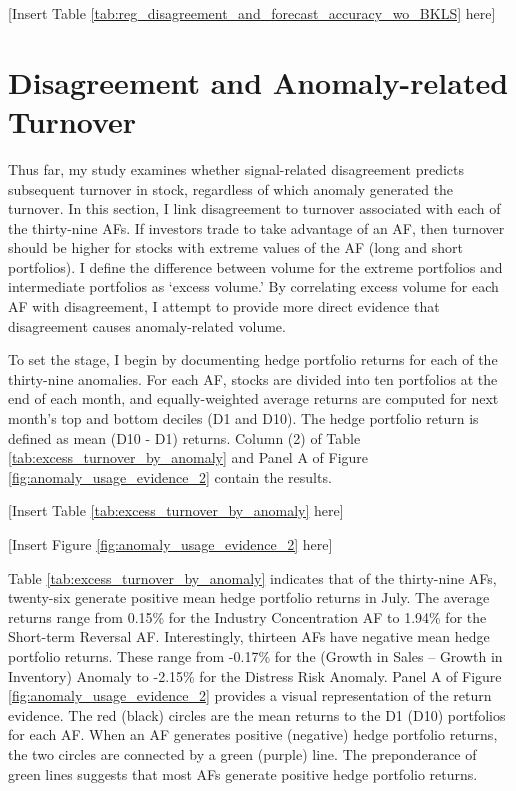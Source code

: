 \documentclass[
  12pt,
  a4paper,
  twoside,
  onecolumn]{article}
\begin{document}
\begin{center} { [Insert Table \ref{tab:reg_disagreement_and_forecast_accuracy_wo_BKLS} here] } \end{center}

\hypertarget{disagreement-and-anomaly-related-turnover}{%
\section{Disagreement and Anomaly-related
Turnover}\label{disagreement-and-anomaly-related-turnover}}

Thus far, my study examines whether signal-related disagreement predicts
subsequent turnover in stock, regardless of which anomaly generated the
turnover. In this section, I link disagreement to turnover associated
with each of the thirty-nine AFs. If investors trade to take advantage
of an AF, then turnover should be higher for stocks with extreme values
of the AF (long and short portfolios). I define the difference between
volume for the extreme portfolios and intermediate portfolios as `excess
volume.' By correlating excess volume for each AF with disagreement, I
attempt to provide more direct evidence that disagreement causes
anomaly-related volume.

To set the stage, I begin by documenting hedge portfolio returns for
each of the thirty-nine anomalies. For each AF, stocks are divided into
ten portfolios at the end of each month, and equally-weighted average
returns are computed for next month's top and bottom deciles (D1 and
D10). The hedge portfolio return is defined as mean (D10 - D1) returns.
Column (2) of Table \ref{tab:excess_turnover_by_anomaly} and Panel A of
Figure \ref{fig:anomaly_usage_evidence_2} contain the results.

\begin{center} { [Insert Table \ref{tab:excess_turnover_by_anomaly} here] } \end{center}

\begin{center} { [Insert Figure \ref{fig:anomaly_usage_evidence_2} here] } \end{center}

Table \ref{tab:excess_turnover_by_anomaly} indicates that of the
thirty-nine AFs, twenty-six generate positive mean hedge portfolio
returns in July. The average returns range from 0.15\% for the Industry
Concentration AF to 1.94\% for the Short-term Reversal AF.
Interestingly, thirteen AFs have negative mean hedge portfolio returns.
These range from -0.17\% for the (Growth in Sales -- Growth in
Inventory) Anomaly to -2.15\% for the Distress Risk Anomaly. Panel A of
Figure \ref{fig:anomaly_usage_evidence_2} provides a visual
representation of the return evidence. The red (black) circles are the
mean returns to the D1 (D10) portfolios for each AF. When an AF
generates positive (negative) hedge portfolio returns, the two circles
are connected by a green (purple) line. The preponderance of green lines
suggests that most AFs generate positive hedge portfolio returns.
\end{document}

